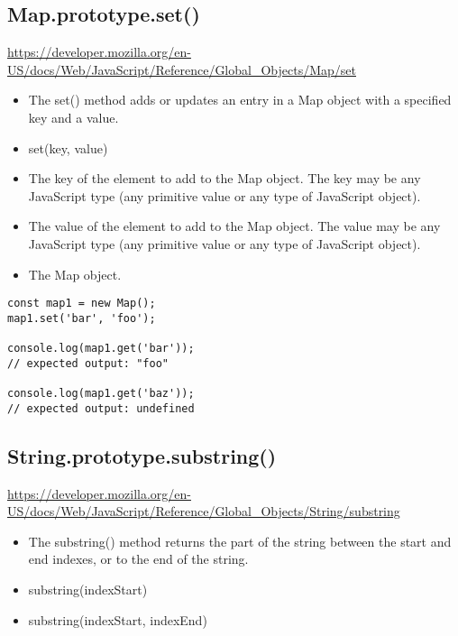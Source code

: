 \documentclass[10pt]{article}
\begin{document}
\medskip %
\pagebreak
\subsection{Map.prototype.set()}

\url{https://developer.mozilla.org/en-US/docs/Web/JavaScript/Reference/Global_Objects/Map/set}

\begin{itemize}
	\item The set() method adds or updates an entry in a Map object with a specified key and a value.
	\item set(key, value)
	\item The key of the element to add to the Map object. The key may be any JavaScript type (any primitive value or any type of JavaScript object).
	\item The value of the element to add to the Map object. The value may be any JavaScript type (any primitive value or any type of JavaScript object).
	\item The Map object.
\end{itemize}

\begin{lstlisting}[title=Example map.set(), captionpos=t]
const map1 = new Map();
map1.set('bar', 'foo');

console.log(map1.get('bar'));
// expected output: "foo"

console.log(map1.get('baz'));
// expected output: undefined
\end{lstlisting}


\medskip %






\medskip %
\pagebreak
\subsection{String.prototype.substring()}

\url{https://developer.mozilla.org/en-US/docs/Web/JavaScript/Reference/Global_Objects/String/substring}

\begin{itemize}
	\item The substring() method returns the part of the string between the start and end indexes, or to the end of the string.
	\item substring(indexStart)
	\item substring(indexStart, indexEnd)
\end{itemize}
\end{document}
